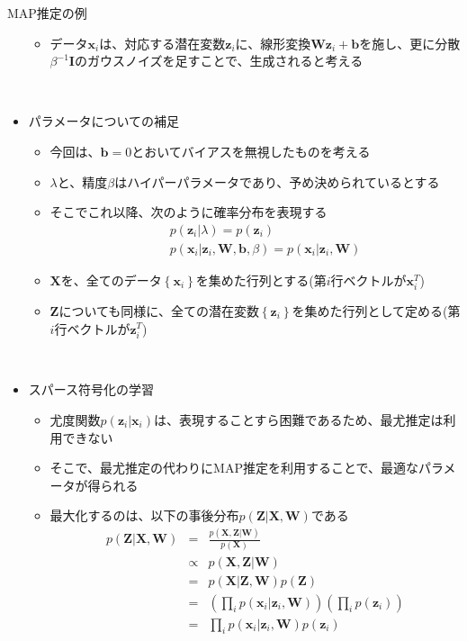 \documentclass[dvipdfmx,notheorems,t]{beamer}
\begin{document}
\begin{frame}{MAP推定の例}
\begin{itemize}
\begin{itemize}
		\item データ$\bm{x}_i$は、対応する潜在変数$\bm{z}_i$に、線形変換$\bm{W} \bm{z}_i + \bm{b}$を施し、更に分散$\beta^{-1} \bm{I}$のガウスノイズを足すことで、生成されると考える
	\end{itemize} \
	
	\item パラメータについての補足
	\begin{itemize}
		\item 今回は、$\bm{b} = 0$とおいて\alert{バイアスを無視}したものを考える
		\item $\lambda$と、精度$\beta$は\alert{ハイパーパラメータ}であり、予め決められているとする
		\item そこでこれ以降、次のように確率分布を表現する
		\begin{eqnarray}
			&& p(\bm{z}_i | \lambda) = p(\bm{z}_i) \\
			&& p(\bm{x}_i | \bm{z}_i, \bm{W}, \bm{b}, \beta) = p(\bm{x}_i | \bm{z}_i, \bm{W})
		\end{eqnarray}
		
		\item $\bm{X}$を、全てのデータ$\left\{ \bm{x}_i \right\}$を集めた行列とする(第$i$行ベクトルが$\bm{x}_i^T$)
		\item $\bm{Z}$についても同様に、全ての潜在変数$\left\{ \bm{z}_i \right\}$を集めた行列として定める(第$i$行ベクトルが$\bm{z}_i^T$)
	\end{itemize} \
	
	\item スパース符号化の学習
	\begin{itemize}
		\item 尤度関数$p(\bm{z}_i | \bm{x}_i)$は、\alert{表現することすら困難}であるため、最尤推定は利用できない
		\item そこで、最尤推定の代わりに\alert{MAP推定}を利用することで、最適なパラメータが得られる
		\newline
		\item 最大化するのは、以下の事後分布$p(\bm{Z} | \bm{X}, \bm{W})$である
		\begin{eqnarray}
			p(\bm{Z} | \bm{X}, \bm{W}) &=& \frac{p(\bm{X}, \bm{Z} | \bm{W})}{p(\bm{X})} \\
			&\propto& p(\bm{X}, \bm{Z} | \bm{W}) \\
			&=& p(\bm{X} | \bm{Z}, \bm{W}) p(\bm{Z}) \\
			&=& \left( \prod_i p(\bm{x}_i | \bm{z}_i, \bm{W}) \right) \left( \prod_i p(\bm{z}_i) \right) \\
			&=& \prod_i p(\bm{x}_i | \bm{z}_i, \bm{W}) p(\bm{z}_i)
		\end{eqnarray}
		

\end{itemize}
\end{itemize}
\end{frame}
\end{document}
